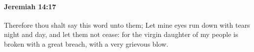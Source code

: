 
		\paragraph{Jeremiah 14:17} %
			\label{JEREMIAH-14-17}

			Therefore thou shalt say this word unto them; Let mine eyes run down with tears night and day, and let them not cease: for the virgin daughter of my people is broken with a great breach, with a very grievous blow.


